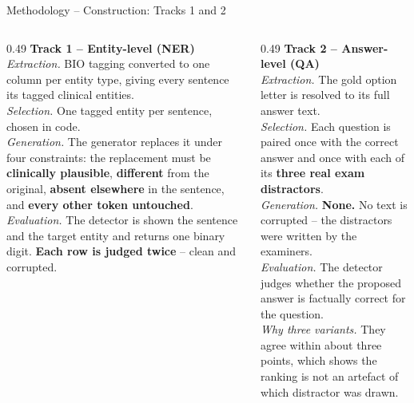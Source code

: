 \documentclass[aspectratio=169,11pt]{beamer}
\begin{document}
\begin{frame}[shrink=12]{Methodology \;--\; Construction: Tracks 1 and 2}
\vspace{-1mm}
{\footnotesize
\begin{columns}[T]
\begin{column}{0.49\textwidth}
\textbf{Track 1 \;--\; Entity-level (NER)}\\[1.5mm]
\emph{Extraction.} BIO tagging converted to one column per entity type, giving every sentence its tagged clinical entities.\\[1.5mm]
\emph{Selection.} One tagged entity per sentence, chosen in code.\\[1.5mm]
\emph{Generation.} The generator replaces it under four constraints: the replacement must be \textbf{clinically plausible}, \textbf{different} from the original, \textbf{absent elsewhere} in the sentence, and \textbf{every other token untouched}.\\[1.5mm]
\emph{Evaluation.} The detector is shown the sentence and the target entity and returns one binary digit. \textbf{Each row is judged twice} -- clean and corrupted.
\end{column}
\begin{column}{0.49\textwidth}
\textbf{Track 2 \;--\; Answer-level (QA)}\\[1.5mm]
\emph{Extraction.} The gold option letter is resolved to its full answer text.\\[1.5mm]
\emph{Selection.} Each question is paired once with the correct answer and once with each of its \textbf{three real exam distractors}.\\[1.5mm]
\emph{Generation.} \textbf{None.} No text is corrupted -- the distractors were written by the examiners.\\[1.5mm]
\emph{Evaluation.} The detector judges whether the proposed answer is factually correct for the question.\\[1.5mm]
\emph{Why three variants.} They agree within about three points, which shows the ranking is not an artefact of which distractor was drawn.
\end{column}
\end{columns}
}
\end{frame}
\end{document}
